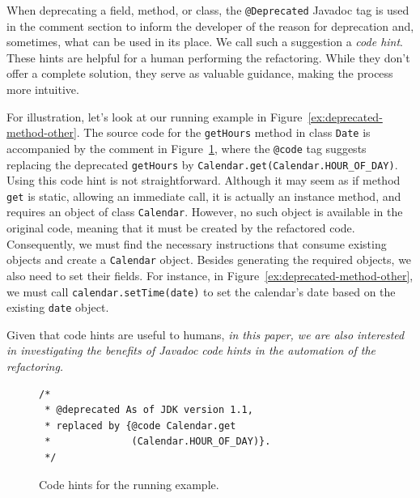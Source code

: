 \documentclass[sigconf]{acmart}
\begin{document}

When deprecating a field, method, or class, the
\lstinline[breaklines=true]{@Deprecated} Javadoc tag is used in the comment
section to inform the developer of the reason for deprecation and,
sometimes, what can be used in its place.  We call such a suggestion a {\em
  code hint}. These hints are helpful for a human performing the refactoring.
While they don’t offer a complete solution, they serve as valuable guidance,
making the process more intuitive.


%
For illustration, let's look at our running example in
Figure~\ref{ex:deprecated-method-other}.  The source code for the
\lstinline[breaklines=true]{getHours} method in class \lstinline[breaklines=true]{Date} is accompanied by the
comment in Figure~\ref{ex:code-hints}, where the \lstinline[breaklines=true]{@code} tag suggests
replacing the deprecated \lstinline[breaklines=true]{getHours} by
\lstinline[breaklines=true]{Calendar.get(Calendar.HOUR_OF_DAY)}.
%
Using this code hint is not straightforward.
Although it may seem as if
method \lstinline[breaklines=true]{get} is static, allowing an immediate call,
it is actually an instance method, and requires an object of
class \lstinline[breaklines=true]{Calendar}. However, no such object is available in the
original code, meaning that it must be created by the refactored code.
Consequently, we must find the necessary
instructions that consume existing objects and create a \lstinline[breaklines=true]{Calendar} object.
Besides generating the required objects, we also need to set their
fields. For instance,
in Figure~\ref{ex:deprecated-method-other}, we must call
\lstinline[breaklines=true]{calendar.setTime(date)} to set the calendar's date
based on the existing \lstinline[breaklines=true]{date} object.

Given that code hints are useful to humans,
\emph{in this paper, we are also interested in investigating the benefits of Javadoc code hints in the automation of the refactoring.}

\begin{figure}
\begin{lstlisting}[mathescape=true,showstringspaces=false]
/*
 * @deprecated As of JDK version 1.1,
 * replaced by {@code Calendar.get
 *              (Calendar.HOUR_OF_DAY)}.
 */
\end{lstlisting}
\caption{Code hints for the running example.}
\label{ex:code-hints}
\end{figure}
\end{document}
